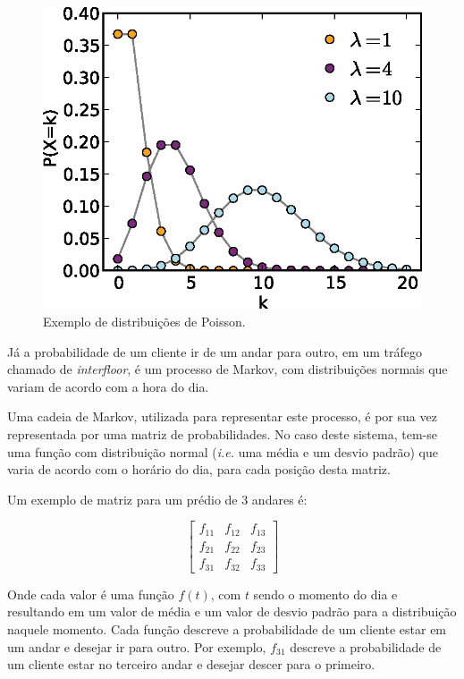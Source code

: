 \begin{figure}[htb!]
  \centering
  \includegraphics[scale=1.0]{img/poisson.eps}
  \caption{Exemplo de distribuições de Poisson.}
\label{fig:distribution:poisson}
\end{figure}

Já a probabilidade de um cliente ir de um andar para outro, em um tráfego
chamado de \textit{interfloor}, é um processo de Markov, com distribuições
normais que variam de acordo com a hora do dia.

Uma cadeia de Markov, utilizada para representar este processo, é por sua vez
representada por uma matriz de probabilidades. No caso deste sistema, tem-se uma
função com distribuição normal (\textit{i.e.} uma média e um desvio padrão) que
varia de acordo com o horário do dia, para cada posição desta matriz.

Um exemplo de matriz para um prédio de 3 andares é:

\[
  \begin{bmatrix}
    f_{11} & f_{12} & f_{13} \\
    f_{21} & f_{22} & f_{23} \\
    f_{31} & f_{32} & f_{33}
  \end{bmatrix}
\]

Onde cada valor é uma função $f(t)$, com $t$ sendo o momento do dia e resultando
em um valor de média e um valor de desvio padrão para a distribuição naquele
momento. Cada função descreve a probabilidade de um cliente estar em um andar e
desejar ir para outro. Por exemplo, $f_{31}$ descreve a probabilidade de um
cliente estar no terceiro andar e desejar descer para o primeiro.


